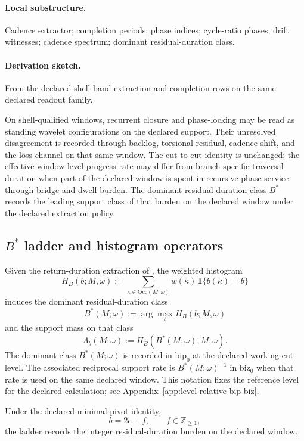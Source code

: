 \paragraph{Local substructure.} Cadence extractor; completion periods; phase indices; cycle-ratio phases; drift witnesses; cadence spectrum; dominant residual-duration class.
\paragraph{Derivation sketch.} From the declared shell-band extraction and completion rows on the same declared readout family.
\begin{remarkx}
On shell-qualified windows, recurrent closure and phase-locking may be read as standing wavelet configurations on the declared support. Their unresolved disagreement is recorded through backlog, torsional residual, cadence shift, and the loss-channel on that same window. The cut-to-cut identity is unchanged; the effective window-level progress rate may differ from branch-specific traversal duration when part of the declared window is spent in recursive phase service through bridge and dwell burden. The dominant residual-duration class $B^*$ records the leading support class of that burden on the declared window under the declared extraction policy.
\end{remarkx}

\subsection{\texorpdfstring{$B^*$}{B*} ladder and histogram operators}\label{subsec:bstar-ladder-operators}
\begin{definition}
\label{def:bstar-operator}
Given the return-duration extraction of , the weighted histogram
\[
H_B(b;M,\omega):=\sum_{\kappa\in\mathrm{Occ}(M;\omega)} w(\kappa)\,\mathbf 1\{b(\kappa)=b\}
\]
induces the dominant residual-duration class
\[
B^*(M;\omega):=\arg\max_b H_B(b;M,\omega)
\]
and the support mass on that class
\[
\Lambda_b(M;\omega):=H_B(B^*(M;\omega);M,\omega).
\]
The dominant class \(B^*(M;\omega)\) is recorded in \(\mathrm{bip}_0\) at the declared working cut level. The associated reciprocal support rate is \(B^*(M;\omega)^{-1}\) in \(\mathrm{biz}_0\) when that rate is used on the same declared window. This notation fixes the reference level for the declared calculation; see Appendix~\ref{app:level-relative-bip-biz}.

Under the declared minimal-pivot identity,
\[
b=2e+f,
\qquad f\in\mathbb Z_{\ge1},
\]
the ladder records the integer residual-duration burden on the declared window.
\end{definition}

